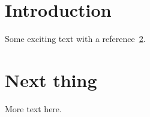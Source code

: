 \documentclass{article}
\begin{document}
\section{Introduction}
Some exciting text with a reference~\ref{sec:next}.

\section{Next thing}
\label{sec:next}

More text here.
\end{document}
